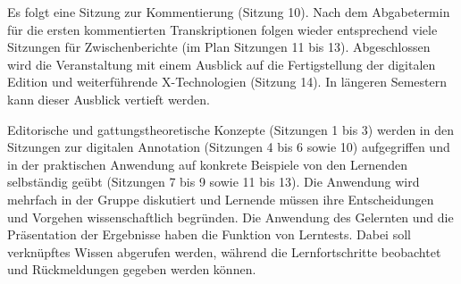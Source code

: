 \documentclass[
          a4paper,
        ]{article}
\begin{document}
Es folgt eine Sitzung zur Kommentierung (Sitzung 10). Nach dem
Abgabetermin für die ersten kommentierten Transkriptionen folgen wieder
entsprechend viele Sitzungen für Zwischenberichte (im Plan Sitzungen 11
bis 13). Abgeschlossen wird die Veranstaltung mit einem Ausblick auf die
Fertigstellung der digitalen Edition und weiterführende X-Technologien
(Sitzung 14). In längeren Semestern kann dieser Ausblick vertieft
werden.

Editorische und gattungstheoretische Konzepte (Sitzungen 1 bis 3) werden
in den Sitzungen zur digitalen Annotation (Sitzungen 4 bis 6 sowie 10)
aufgegriffen und in der praktischen Anwendung auf konkrete Beispiele von
den Lernenden selbständig geübt (Sitzungen 7 bis 9 sowie 11 bis 13). Die
Anwendung wird mehrfach in der Gruppe diskutiert und Lernende müssen
ihre Entscheidungen und Vorgehen wissenschaftlich begründen. Die
Anwendung des Gelernten und die Präsentation der Ergebnisse haben die
Funktion von Lerntests. Dabei soll verknüpftes Wissen abgerufen werden,
während die Lernfortschritte beobachtet und Rückmeldungen gegeben werden
können.
\end{document}
